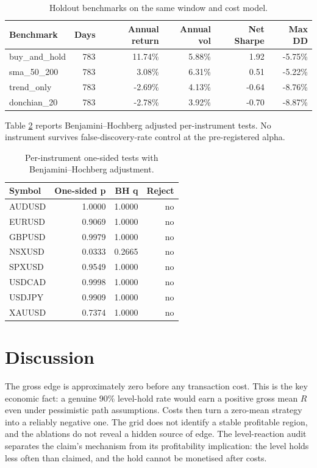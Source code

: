 \documentclass[11pt,a4paper]{article}
\begin{document}
\begin{table}[htbp]
\centering
\small
\setlength{\tabcolsep}{4pt}
\caption{Holdout benchmarks on the same window and cost model.}
\label{tab:benchmarks}
\begin{tabular}{lrrrrr}
\toprule
Benchmark & Days & Annual return & Annual vol & Net Sharpe & Max DD \\
\midrule
buy\_and\_hold & 783 & 11.74\% & 5.88\% & 1.92 & -5.75\% \\
sma\_50\_200 & 783 & 3.08\% & 6.31\% & 0.51 & -5.22\% \\
trend\_only & 783 & -2.69\% & 4.13\% & -0.64 & -8.76\% \\
donchian\_20 & 783 & -2.78\% & 3.92\% & -0.70 & -8.87\% \\
\bottomrule
\end{tabular}
\end{table}
Table \ref{tab:bh} reports Benjamini--Hochberg adjusted per-instrument tests. No instrument survives false-discovery-rate control at the pre-registered alpha.
\begin{table}[htbp]
\centering
\small
\setlength{\tabcolsep}{4pt}
\caption{Per-instrument one-sided tests with Benjamini--Hochberg adjustment.}
\label{tab:bh}
\begin{tabular}{lrrr}
\toprule
Symbol & One-sided p & BH q & Reject \\
\midrule
AUDUSD & 1.0000 & 1.0000 & no \\
EURUSD & 0.9069 & 1.0000 & no \\
GBPUSD & 0.9979 & 1.0000 & no \\
NSXUSD & 0.0333 & 0.2665 & no \\
SPXUSD & 0.9549 & 1.0000 & no \\
USDCAD & 0.9998 & 1.0000 & no \\
USDJPY & 0.9909 & 1.0000 & no \\
XAUUSD & 0.7374 & 1.0000 & no \\
\bottomrule
\end{tabular}
\end{table}
\section{Discussion}
The gross edge is approximately zero before any transaction cost. This is the key economic fact: a genuine 90\% level-hold rate would earn a positive gross mean $R$ even under pessimistic path assumptions. Costs then turn a zero-mean strategy into a reliably negative one. The grid does not identify a stable profitable region, and the ablations do not reveal a hidden source of edge. The level-reaction audit separates the claim's mechanism from its profitability implication: the level holds less often than claimed, and the hold cannot be monetised after costs.
\end{document}

